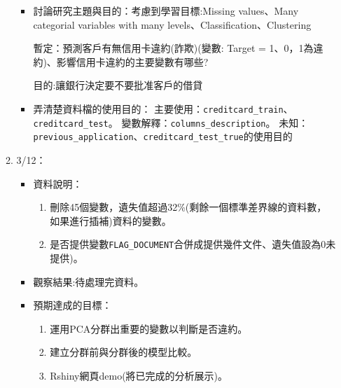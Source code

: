 \documentclass[12pt, a4paper]{article}
\begin{document}
\begin{itemize}
\begin{enumerate}
\begin{itemize}
\item 討論研究主題與目的：考慮到學習目標:Missing values、Many categorial variables with many levels、Classification、Clustering                               

暫定：預測客戶有無信用卡違約(詐欺)(變數: Target = 1、0，1為違約)、影響信用卡違約的主要變數有哪些?

目的:讓銀行決定要不要批准客戶的借貸
\item 弄清楚資料檔的使用目的：
主要使用：\verb|creditcard_train|、\verb|creditcard_test|。
變數解釋：\verb|columns_description|。
未知：\verb|previous_application|、\verb|creditcard_test_true|的使用目的
\end{itemize}

\item 3/12：
\begin{itemize}
\item 資料說明：
\begin{enumerate}
\item 刪除45個變數，遺失值超過32\%(剩餘一個標準差界線的資料數，如果進行插補)資料的變數。
\item 是否提供變數\verb|FLAG_DOCUMENT|合併成提供幾件文件、遺失值設為0未提供)。
\end{enumerate}
\item 觀察結果:待處理完資料。
\item 預期達成的目標：
\begin{enumerate}
\item 運用PCA分群出重要的變數以判斷是否違約。
\item 建立分群前與分群後的模型比較。
\item Rshiny網頁demo(將已完成的分析展示)。
\end{enumerate}
\end{itemize}







\end{enumerate}
\end{itemize}
\end{document}
